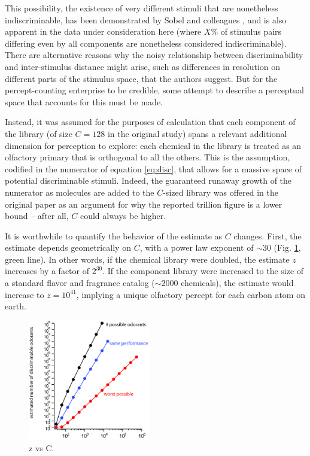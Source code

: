 \documentclass[letterpaper,twocolumn,10pt]{article}
\begin{document}
This possibility, the existence of very different stimuli that are nonetheless indiscriminable, 
has been demonstrated by Sobel and colleagues \cite{weiss_perceptual_2012}, 
and is also apparent in the data under consideration here 
(where $X\%$ of stimulus pairs differing even by all components are nonetheless considered indiscriminable).  
There are alternative reasons why the noisy relationship between discriminability and inter-stimulus distance might arise, 
such as differences in resolution on different parts of the stimulus space, that the authors suggest.  
But for the percept-counting enterprise to be credible, 
some attempt to describe a perceptual space that accounts for this must be made. 

Instead, it was assumed for the purposes of calculation that each component of the library 
(of size $C=128$ in the original study) 
spans a relevant additional dimension for perception to explore: 
each chemical in the library is treated as an olfactory primary that is orthogonal to all the others. 
This is the assumption, codified in the numerator of equation \ref{eq:disc}, 
that allows for a massive space of potential discriminable stimuli. 
Indeed, the guaranteed runaway growth of the numerator as molecules are added to the $C$-sized library was offered in the original paper as an argument for why the reported trillion figure is a lower bound -- after all, $C$ could always be higher. 

It is worthwhile to quantify the behavior of the estimate as $C$ changes. 
First, the estimate depends geometrically on $C$, 
with a power law exponent of $\sim 30$ (Fig. \ref{fig:z_vs_C}, green line). 
In other words, if the chemical library were doubled, 
the estimate $z$ increases by a factor of $2^{30}$. 
If the component library were increased to the size of a standard flavor and fragrance catalog ($\sim 2000$ chemicals), 
the estimate would increase to $z=10^{41}$, 
implying a unique olfactory percept for each carbon atom on earth. 

\begin{figure}
    \centering
    \includegraphics[width=0.475\textwidth]{figures/FigX_C}
    \caption{
z vs C.}
    \label{fig:z_vs_C}
\end{figure} 
\end{document}
